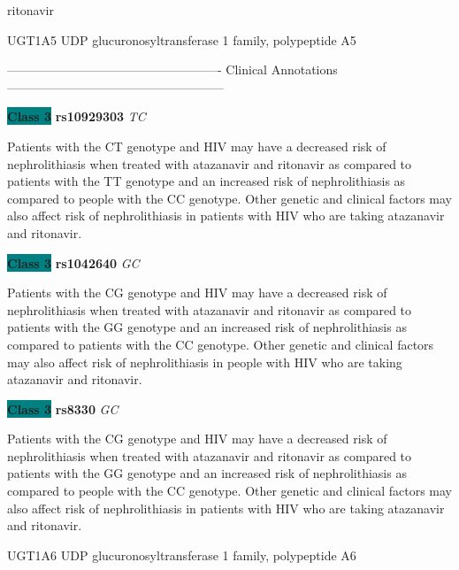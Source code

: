 \documentclass{resume} %
\begin{document}
\begin{rSection}{ ritonavir }
\begin{rSubsection}{ UGT1A5 }{ UDP glucuronosyltransferase 1 family, polypeptide A5 }{}{}
\item[] ---------------------------------------------------- Clinical Annotations -----------------------------------------------------\newline
\item \textbf{\colorbox{teal} {Class 3}} \textbf{ rs10929303 } \textit{ TC }
\item[] Patients with the CT genotype and HIV may have a decreased risk of nephrolithiasis when treated with atazanavir and ritonavir as compared to patients with the TT genotype and an increased risk of nephrolithiasis as compared to people with the CC genotype. Other genetic and clinical factors may also affect risk of nephrolithiasis in patients with HIV who are taking atazanavir and ritonavir. \item \textbf{\colorbox{teal} {Class 3}} \textbf{ rs1042640 } \textit{ GC }
\item[] Patients with the CG genotype and HIV may have a decreased risk of nephrolithiasis when treated with atazanavir and ritonavir as compared to patients with the GG genotype and an increased risk of nephrolithiasis as compared to patients with the CC genotype. Other genetic and clinical factors may also affect risk of nephrolithiasis in people with HIV who are taking atazanavir and ritonavir.\item \textbf{\colorbox{teal} {Class 3}} \textbf{ rs8330 } \textit{ GC }
\item[] Patients with the CG genotype and HIV may have a decreased risk of nephrolithiasis when treated with atazanavir and ritonavir as compared to patients with the GG genotype and an increased risk of nephrolithiasis as compared to people with the CC genotype. Other genetic and clinical factors may also affect risk of nephrolithiasis in patients with HIV who are taking atazanavir and ritonavir.
\end{rSubsection}\begin{rSubsection}{ UGT1A6 }{ UDP glucuronosyltransferase 1 family, polypeptide A6 }{}{}
\item[]


\end{rSubsection}
\end{rSection}
\end{document}
